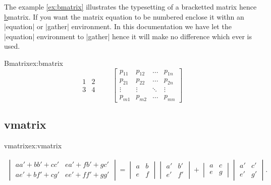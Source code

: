 The example \ref{ex:bmatrix} illustrates the typesetting of a bracketted matrix hence \ul{b}matrix. If you want the matrix equation to be numbered enclose it withn an |equation| or |gather| environment. In this documentation we have let the |equation| environment to |gather| hence it will make no difference which ever is used.

\begin{texexample}{Bmatrix}{ex:bmatrix}
\begin{equation}
\begin{matrix}
1 & 2 \\
3 & 4
\end{matrix} \qquad
\begin{bmatrix}
p_{11} & p_{12} & \ldots & p_{1n} \\
p_{21} & p_{22} & \ldots & p_{2n} \\
\vdots & \vdots & \ddots & \vdots \\
p_{m1} & p_{m2} & \ldots & p_{mn}
\end{bmatrix}
\end{equation}
\end{texexample}



\subsection{vmatrix}

\begin{texexample}{vmatrix}{ex:vmatrix}

\begin{gather}
\begin{vmatrix}
aa' + bb' + cc' & ea' + fb' + gc' \\
ae' + bf' + cg' & ee' + ff' + gg'
\end{vmatrix}
{} = \begin{vmatrix}
a & b \\
e & f
\end{vmatrix}  \begin{vmatrix}
a' & b' \\
e' & f'
\end{vmatrix} + \begin{vmatrix}
a & c \\
e & g
\end{vmatrix}  \begin{vmatrix}
a' & c' \\
e' & g'
\end{vmatrix}.
\end{gather}
\end{texexample}





